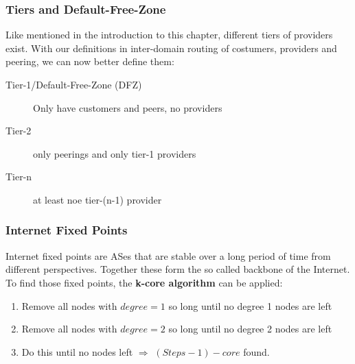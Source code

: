 \subsubsection*{Tiers and Default-Free-Zone}
Like mentioned in the introduction to this chapter, different tiers of providers exist.
With our definitions in inter-domain routing of costumers, providers and peering, we can now better define them:
\begin{description}
  \item[Tier-1/Default-Free-Zone (DFZ)] Only have customers and peers, no providers
  \item[Tier-2] only peerings and only tier-1 providers
  \item[Tier-n] at least noe tier-(n-1) provider
\end{description}

\subsubsection*{Internet Fixed Points}
Internet fixed points are ASes that are stable over a long period of time from different perspectives.
Together these form the so called backbone of the Internet.
To find those fixed points, the \textbf{k-core algorithm} can be applied:
\begin{enumerate}
  \item Remove all nodes with $degree = 1$ so long until no degree 1 nodes are left
  \item Remove all nodes with $degree = 2$ so long until no degree 2 nodes are left
  \item Do this until no nodes left $\Rightarrow$ $(Steps - 1)-core$ found.
\end{enumerate}
